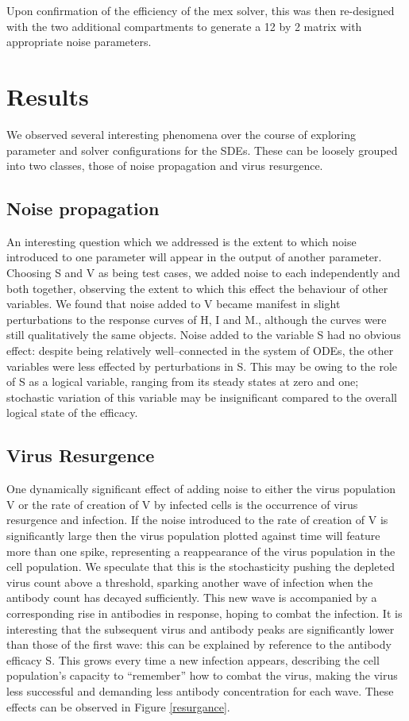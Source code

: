 \documentclass[a4paper, 12pt]{report}
\begin{document}
Upon confirmation of the efficiency of the mex solver, this was then re-designed with the two additional compartments to generate a 12 by 2 matrix with appropriate noise parameters.

\section{Results}

We observed several interesting phenomena over the course of exploring parameter and solver configurations for the SDEs. These can be loosely grouped into two classes, those of noise propagation and virus resurgence.

\subsection{Noise propagation}

An interesting question which we addressed is the extent to which noise introduced to one parameter will appear in the output of another parameter. Choosing S and V as being test cases, we added noise to each independently and both together, observing the extent to which this effect the behaviour of other variables. We found that noise added to V became manifest in slight perturbations to the response curves of H, I and M., although the curves were still qualitatively the same objects. Noise added to the variable S had no obvious effect: despite being relatively well--connected in the system of ODEs, the other variables were less effected by perturbations in S. This may be owing to the role of S as a logical variable, ranging from its steady states at zero and one; stochastic variation of this variable may be insignificant compared to the overall logical state of the efficacy.

\subsection{Virus Resurgence}

One dynamically significant effect of adding noise to either the virus population V or the rate of creation of V by infected cells is the occurrence of virus resurgence and infection. If the noise introduced to the rate of creation of V is significantly large then the virus population plotted against time will feature more than one spike, representing a reappearance of the virus population in the cell population. We speculate that this is the stochasticity pushing the depleted virus count above a threshold, sparking another wave of infection when the antibody count has decayed sufficiently. This new wave is accompanied by a corresponding rise in antibodies in response, hoping to combat the infection. It is interesting that the subsequent virus and antibody peaks are significantly lower than those of the first wave: this can be explained by reference to the antibody efficacy S. This grows every time a new infection appears, describing the cell population's capacity to ``remember'' how to combat the virus, making the virus less successful and demanding less antibody concentration for each wave. These effects can be observed in Figure \ref{resurgance}.
\end{document}
